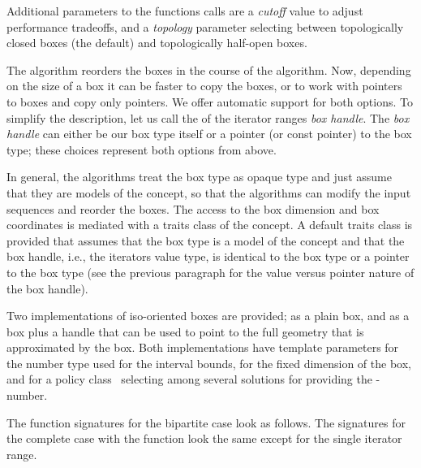 Additional parameters to the functions calls are a \emph{cutoff\/}
value to adjust performance tradeoffs, and a \emph{topology\/} parameter
selecting between topologically closed boxes (the default) and
topologically half-open boxes.

The algorithm reorders the boxes in the course of the algorithm. Now,
depending on the size of a box it can be faster to copy the boxes, or
to work with pointers to boxes and copy only pointers. We offer
automatic support for both options. To simplify the description, let us
call the  of the iterator ranges \emph{box handle}.
The \emph{box handle\/} can either be our box type itself or a
pointer (or const pointer) to the box type; these choices represent
both options from above.

In general, the algorithms treat the box type as opaque type and just
assume that they are models of the  concept, so that
the algorithms can modify the input sequences and reorder the boxes.
The access to the box dimension and box coordinates is mediated with a
traits class of the  concept. A default
traits class is provided that assumes that the box type is a model of
the  concept and that the box handle, i.e.,
the iterators value type, is identical to the box type or a pointer
to the box type (see the previous paragraph for the value versus
pointer nature of the box handle).

Two implementations of iso-oriented boxes are provided;
 as a plain box, and
 as a box plus a
handle that can be used to point to the full geometry that is
approximated by the box. Both implementations have template parameters
for the number type used for the interval bounds, for the fixed
dimension of the box, and for a policy class~\cite{cgal:a-mcdgp-01}
selecting among several solutions for providing the -number.

The function signatures for the bipartite case look as follows. The 
signatures for the complete case with the 
function look the same except for the single iterator range.


 
